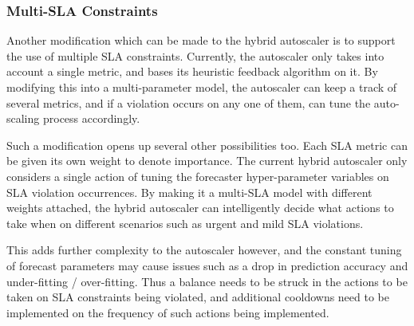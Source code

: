 \subsubsection{Multi-SLA Constraints}
\label{subsubsec:ch7-multi-sla}

Another modification which can be made to the hybrid autoscaler is to support the use of multiple SLA constraints. Currently, the autoscaler only takes into account a single metric, and bases its heuristic feedback algorithm on it. By modifying this into a multi-parameter model, the autoscaler can keep a track of several metrics, and if a violation occurs on any one of them, can tune the auto-scaling process accordingly.\par

Such a modification opens up several other possibilities too. Each SLA metric can be given its own weight to denote importance. The current hybrid autoscaler only considers a single action of tuning the forecaster hyper-parameter variables on SLA violation occurrences. By making it a multi-SLA model with different weights attached, the hybrid autoscaler can intelligently decide what actions to take when on different scenarios such as urgent and mild SLA violations.\par

This adds further complexity to the autoscaler however, and the constant tuning of forecast parameters may cause issues such as a drop in prediction accuracy and under-fitting / over-fitting. Thus a balance needs to be struck in the actions to be taken on SLA constraints being violated, and additional cooldowns need to be implemented on the frequency of such actions being implemented.

